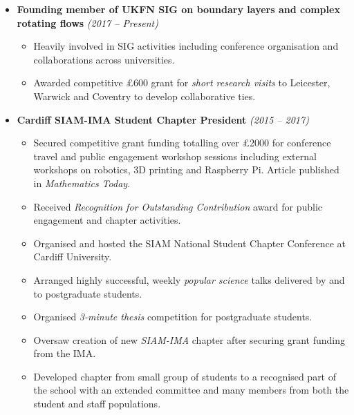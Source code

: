 \documentclass[10pt,a4paper,sans]{moderncv}        %
\begin{document}
	\begin{itemize}
		
		\item{\textbf{Founding member of UKFN SIG on boundary layers and complex rotating flows} \hfill \textit{(2017 -- Present)}
			
			\vspace{4pt}
			
			\small{
				\begin{itemize}	
					\item Heavily involved in SIG activities including conference organisation and collaborations across universities.
					\vspace{3pt}
					\item Awarded competitive £600 grant for \textit{short research visits} to Leicester, Warwick and Coventry to develop collaborative ties. 
				\end{itemize}
				
		}}
		
		\vspace{6pt}
		
		\item{\textbf{Cardiff SIAM-IMA Student Chapter President} \hfill\textit{(2015 -- 2017)}
			
			\vspace{4pt}
			
			\small{
				\begin{itemize}	
					\item Secured competitive grant funding totalling over £2000 for conference travel and public engagement workshop sessions including external workshops on robotics, 3D printing and Raspberry Pi. Article published in \textit{Mathematics Today}.
					\vspace{3pt}
					\item Received \textit{Recognition for Outstanding Contribution} award for public engagement and chapter activities.
					\vspace{3pt}
					\item Organised and hosted the SIAM National Student Chapter Conference at Cardiff University.
					\vspace{3pt}
					\item Arranged highly successful, weekly \textit{popular science} talks delivered by and to postgraduate students.
					\vspace{3pt}
					\item Organised \textit{3-minute thesis} competition for postgraduate students.	
					\vspace{3pt}
					\item Oversaw creation of new \textit{SIAM-IMA} chapter after securing grant funding from the IMA.
					\vspace{3pt}
					\item Developed chapter from small group of students to a recognised part of the school with an extended committee and many members from both the student and staff populations.
				\end{itemize}
		}}
		

\end{itemize}
\end{document}
